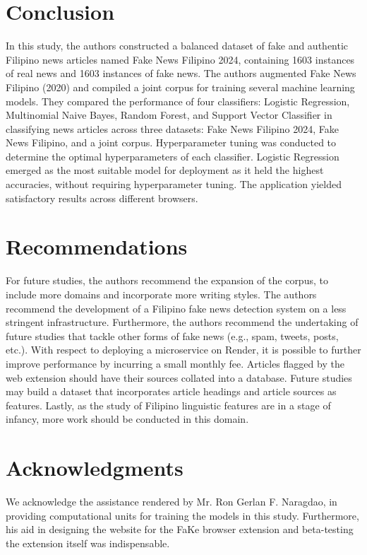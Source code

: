\documentclass[conference]{IEEEtran}
\begin{document}
\section{Conclusion}

In this study, the authors constructed a balanced dataset of fake and authentic Filipino news articles named Fake News Filipino 2024, containing 1603 instances of real news and 1603 instances of fake news. The authors augmented Fake News Filipino (2020) and compiled a joint corpus for training several machine learning models. They compared the performance of four classifiers: Logistic Regression, Multinomial Naive Bayes, Random Forest, and Support Vector Classifier in classifying news articles across three datasets: Fake News Filipino 2024, Fake News Filipino, and a joint corpus. Hyperparameter tuning was conducted to determine the optimal hyperparameters of each classifier. Logistic Regression emerged as the most suitable model for deployment as it held the highest accuracies, without requiring hyperparameter tuning. The application yielded satisfactory results across different browsers.

\section{Recommendations}

For future studies, the authors recommend the expansion of the corpus, to include more domains and incorporate more writing styles. The authors recommend the development of a Filipino fake news detection system on a less stringent infrastructure. Furthermore, the authors recommend the undertaking of future studies that tackle other forms of fake news (e.g., spam, tweets, posts, etc.). With respect to deploying a microservice on Render, it is possible to further improve performance by incurring a small monthly fee. Articles flagged by the web extension should have their sources collated into a database. Future studies may build a dataset that incorporates article headings and article sources as features. Lastly, as the study of Filipino linguistic features are in a stage of infancy, more work should be conducted in this domain.

\section*{Acknowledgments}

We acknowledge the assistance rendered by Mr. Ron Gerlan F. Naragdao, in providing computational units for training the models in this study. Furthermore, his aid in designing the website for the FaKe browser extension and beta-testing the extension itself was indispensable.
\end{document}
